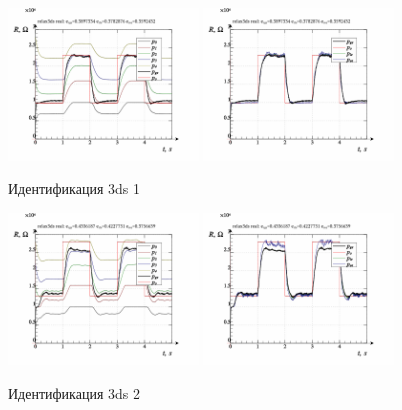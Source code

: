 \begin{figure}[htb!]
  \centerline{
    \includegraphics[width=0.45\textwidth]{p/relax3d_read_id2_1-p_p.png}
    \hfill
    \includegraphics[width=0.45\textwidth]{p/relax3d_read_id2_1-p_pp.png}
  }
  \caption{Идентификация 3ds 1}
  \label{atu:f:relax3ds_id_1}
\end{figure}

\begin{figure}[htb!]
  \centerline{
    \includegraphics[width=0.45\textwidth]{p/relax3d_read_id2_2-p_p.png}
    \hfill
    \includegraphics[width=0.45\textwidth]{p/relax3d_read_id2_2-p_pp.png}
  }
  \caption{Идентификация 3ds 2}
  \label{atu:f:relax3ds_id_2}
\end{figure}


